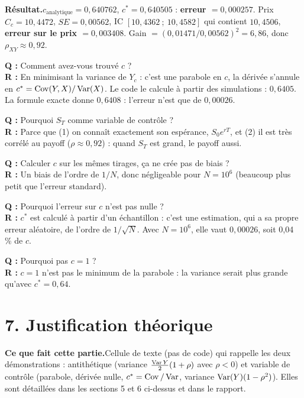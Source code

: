 \documentclass[11pt,a4paper]{article}
\newcommand{\quoi}[1]{\par\noindent\textbf{\color{bleu}Ce que fait cette partie.}\enspace #1\par}
\newcommand{\resultat}[1]{\par\noindent\textbf{\color{vert}Résultat.}\enspace #1\par}
\newcommand{\prof}[2]{\begin{tcolorbox}[colback=orange!6,colframe=orange!80,boxrule=0.4pt,arc=2pt,left=5pt,right=5pt,top=2pt,bottom=2pt]\small\textbf{Q :} #1\\[1pt]\textbf{R :} #2\end{tcolorbox}}
\newcommand{\sect}[1]{\clearpage\section{#1}}
\begin{document}
\resultat{$c_{\text{analytique}} = 0{,}640762$, $c^* = 0{,}640505$ : \textbf{erreur $= 0{,}000257$}. Prix $\hat C_c = 10{,}4472$, $SE = 0{,}00562$, IC $[10{,}4362\ ;\ 10{,}4582]$ qui contient $10{,}4506$, \textbf{erreur sur le prix $= 0{,}003408$}. Gain $= (0{,}01471/0{,}00562)^2 = 6{,}86$, donc $\rho_{XY}\approx0{,}92$.}
\prof{Comment avez-vous trouvé $c$ ?}{En minimisant la variance de $Y_c$ : c'est une parabole en $c$, la dérivée s'annule en $c^* = \operatorname{Cov}(Y,X)/\operatorname{Var}(X)$. Le code le calcule à partir des simulations : $0{,}6405$. La formule exacte donne $0{,}6408$ : l'erreur n'est que de $0{,}00026$.}
\prof{Pourquoi $S_T$ comme variable de contrôle ?}{Parce que (1) on connaît exactement son espérance, $S_0e^{rT}$, et (2) il est très corrélé au payoff ($\rho\approx0{,}92$) : quand $S_T$ est grand, le payoff aussi.}
\prof{Calculer $c$ sur les mêmes tirages, ça ne crée pas de biais ?}{Un biais de l'ordre de $1/N$, donc négligeable pour $N = 10^6$ (beaucoup plus petit que l'erreur standard).}
\prof{Pourquoi l'erreur sur $c$ n'est pas nulle ?}{$c^*$ est calculé à partir d'un échantillon : c'est une estimation, qui a sa propre erreur aléatoire, de l'ordre de $1/\sqrt N$. Avec $N = 10^6$, elle vaut $0{,}00026$, soit 0,04 \% de $c$.}
\prof{Pourquoi pas $c = 1$ ?}{$c = 1$ n'est pas le minimum de la parabole : la variance serait plus grande qu'avec $c^* = 0{,}64$.}

\sect{7. Justification théorique}
\quoi{Cellule de texte (pas de code) qui rappelle les deux démonstrations : antithétique (variance $\frac{\operatorname{Var} Y}{2}(1+\rho)$ avec $\rho<0$) et variable de contrôle (parabole, dérivée nulle, $c^* = \operatorname{Cov}/\operatorname{Var}$, variance $\operatorname{Var}(Y)(1-\rho^2)$). Elles sont détaillées dans les sections 5 et 6 ci-dessus et dans le rapport.}
\end{document}
